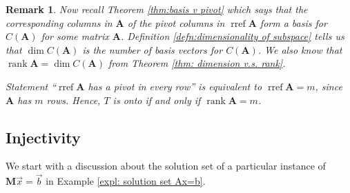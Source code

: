 \documentclass[]{book}
\DeclareMathOperator{\rref}{rref}
\DeclareMathOperator{\spacedim}{dim}
\DeclareMathOperator{\rank}{rank}
\newcommand{\mat}[1]{\ensuremath{\mathbf{#1}}}
\newtheorem*{remark}{Remark}
\begin{document}
\begin{remark}
    Now recall Theorem \ref{thm:basis v pivot} which says that the corresponding columns in $\mat{A}$ of the pivot columns in $\rref\mat{A}$ form a basis for $C(\mat{A})$ for some matrix $\mat{A}$. Definition \ref{defn:dimensionality of subspace} tells us that $\spacedim C(\mat{A})$ is the number of basis vectors for $C(\mat{A})$. We also know that $\rank\mat{A}=\spacedim C(\mat{A})$ from Theorem \ref{thm: dimension v.s. rank}. 
    
    Statement ``$\rref\mat{A}$ has a pivot in every row'' is equivalent to $\rref\mat{A} = m$, since $\mat{A}$ has $m$ rows. Hence, $T$ is onto if and only if $\rank\mat{A} = m$.
\end{remark}

\subsection{Injectivity}
We start with a discussion about the solution set of a particular instance of $\mat{M}\vec{x}=\vec{b}$ in Example \ref{expl: solution set Ax=b}.
\end{document}
